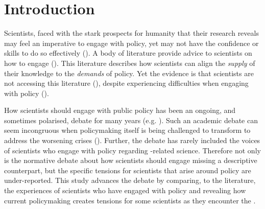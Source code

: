 \chapter{Introduction}\label{ch:intro}

Scientists, faced with the stark prospects for humanity that their research reveals may feel an imperative to engage with policy, yet may not have the confidence or skills to do so effectively (\cite{BednarekSHG2015,KennyRHTB2017,KEU2021perceptions}). A body of literature provide advice to scientists on how to engage (\cite{OliverC2019}). This literature describes how scientists can align the \emph{supply} of their knowledge to the \emph{demands} of policy. Yet the evidence is that scientists are not accessing this literature (\cite{CairneyTS2023}), despite experiencing difficulties when engaging with policy (\cite{Stirling2010,Obermeister2022,Gerber2023,Hicks2024}).

How scientists should engage with public policy has been an ongoing, and sometimes polarised, debate for many years (e.g. \cite{Lackey2004,Nau2009,Stirling2010,Milman2013,Tyler2013,Oreskes2020,GluckmanBK2021,GregoryBW2024,Bisbal2024,Hicks2024}). %
Such an academic debate can seem incongruous when policymaking itself is being challenged to transform to address the worsening \CAN{} crises (\cite{DiazEtAl2019,LaybournTS2023,VerfuerthDCWP2023,Hewitt2024,GuptaEtAl2024}). Further, the debate has rarely included the voices of scientists who engage with policy regarding \CAN-related science. Therefore not only is the normative debate about how scientists should engage missing a descriptive counterpart, but the specific tensions for scientists that arise around \CAN{} policy are under-reported. This study advances the debate by comparing, to the literature, the experiences of scientists who have engaged with \CAN{} policy and revealing how current policymaking creates tensions for some scientists as they encounter the \CAN{} \SPI.

